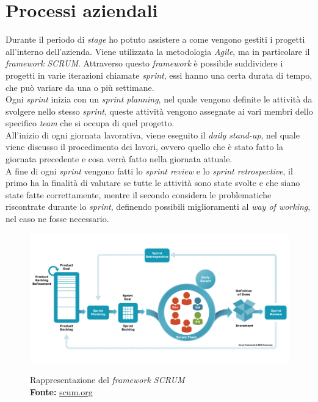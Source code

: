 \section{Processi aziendali}\noindent
Durante il periodo di \textit{stage} ho potuto assistere a come vengono gestiti i progetti all'interno dell'azienda. Viene utilizzata la metodologia \textit{Agile}, ma in particolare il \textit{framework SCRUM}.
Attraverso questo \textit{framework} è possibile suddividere i progetti in varie iterazioni chiamate \textit{sprint}, essi hanno una certa durata di tempo, che può variare da una o più settimane.\\
Ogni \textit{sprint} inizia con un \textit{sprint planning}, nel quale vengono definite le attività da svolgere nello stesso \textit{sprint}, queste attività vengono assegnate ai vari membri dello specifico \textit{team} che si occupa di quel progetto.\\
All'inizio di ogni giornata lavorativa, viene eseguito il \textit{daily stand-up}, nel quale viene discusso il procedimento dei lavori, ovvero quello che è stato fatto la giornata precedente e cosa verrà fatto nella giornata attuale.\\
A fine di ogni \textit{sprint} vengono fatti lo \textit{sprint review} e lo \textit{sprint retrospective}, il primo ha la finalità di valutare se tutte le attività sono state svolte e che siano state fatte correttamente, mentre il secondo considera le problematiche riscontrate durante lo \textit{sprint}, definendo possibili miglioramenti al \textit{way of working}, nel caso ne fosse necessario.
\begin{figure}[H]
    \centering
    \includegraphics[alt={Rappresentazione del framework SCRUM}, width=0.6\columnwidth]{img/scrum.png}
    \caption[Rappresentazione del \textit{framework SCRUM}]{Rappresentazione del \textit{framework SCRUM}\\ \textbf{Fonte:} \href{https://www.scrum.org/resources/what-scrum-module}{scum.org}}
    \label{fig:scrum}
\end{figure}

